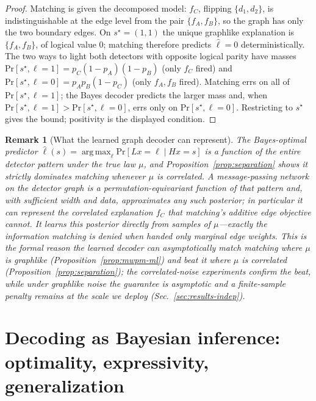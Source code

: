 \documentclass[aps,prxquantum,twocolumn,superscriptaddress,nofootinbib,longbibliography]{revtex4-2}
\newtheorem{remark}{Remark}
\DeclareMathOperator*{\argmax}{arg\,max}
\newcommand{\PR}{\mathrm{Pr}}
\begin{document}
\begin{proof}
Matching is given the decomposed model: $f_C$, flipping $\{d_1,d_2\}$, is
indistinguishable at the edge level from the pair $\{f_A,f_B\}$, so the graph has
only the two boundary edges. On $s^\star=(1,1)$ the unique graphlike explanation
is $\{f_A,f_B\}$, of logical value $0$; matching therefore predicts $\hat\ell=0$
deterministically. The two ways to light both detectors with opposite logical
parity have masses $\PR[s^\star,\ell{=}1]=p_C(1-p_A)(1-p_B)$ (only $f_C$ fired)
and $\PR[s^\star,\ell{=}0]=p_Ap_B(1-p_C)$ (only $f_A,f_B$ fired). Matching errs on
all of $\PR[s^\star,\ell{=}1]$; the Bayes decoder predicts the larger mass and,
when $\PR[s^\star,\ell{=}1]>\PR[s^\star,\ell{=}0]$, errs only on
$\PR[s^\star,\ell{=}0]$. Restricting to $s^\star$ gives the bound; positivity is
the displayed condition.
\end{proof}

\begin{remark}[What the learned graph decoder can represent]
\label{rem:capacity}
The Bayes-optimal predictor $\hat\ell(s)=\argmax_\ell\PR[Lx=\ell\mid Hx=s]$ is a
function of the entire detector pattern under the true law $\mu$, and
Proposition~\ref{prop:separation} shows it strictly dominates matching whenever
$\mu$ is correlated. A message-passing network on the detector graph is a
permutation-equivariant function of that pattern and, with sufficient width and
data, approximates any such posterior; in particular it can represent the
correlated explanation $f_C$ that matching's additive edge objective cannot. It
learns this posterior directly from samples of $\mu$---exactly the information
matching is denied when handed only marginal edge weights. This is the formal
reason the learned decoder can asymptotically match matching where $\mu$ is
graphlike (Proposition~\ref{prop:mwpm-ml}) and beat it where $\mu$ is correlated
(Proposition~\ref{prop:separation}); the correlated-noise experiments confirm
the beat, while under graphlike noise the guarantee is asymptotic and a
finite-sample penalty remains at the scale we deploy
(Sec.~\ref{sec:results-indep}).
\end{remark}

\section{Decoding as Bayesian inference: optimality, expressivity, generalization}
\label{sec:bayes}
\end{document}
